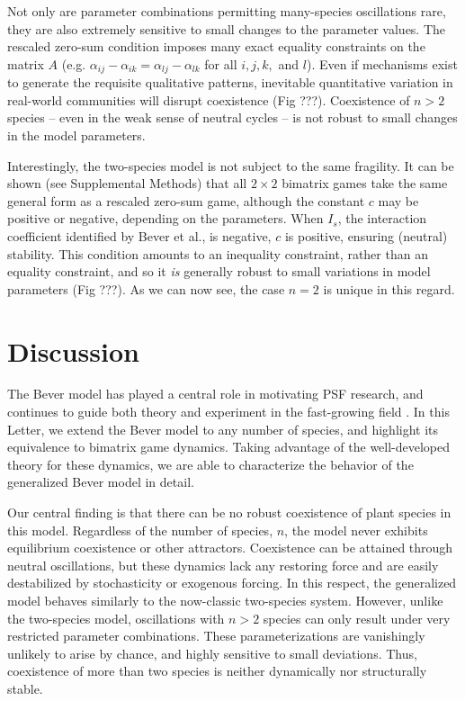 \documentclass[11pt]{article}
\begin{document}
Not only are parameter combinations permitting many-species oscillations rare, they are also extremely sensitive to small changes to the parameter values. The rescaled zero-sum condition imposes many exact equality constraints on the matrix $A$ (e.g. $\alpha_{ij} - \alpha_{ik} = \alpha_{lj} - \alpha_{lk}$ for all $i, j, k,$ and $l$). Even if mechanisms exist to generate the requisite qualitative patterns, inevitable quantitative variation in real-world communities will disrupt coexistence (Fig ???). Coexistence of $n > 2$ species -- even in the weak sense of neutral cycles -- is not robust to small changes in the model parameters.

Interestingly, the two-species model is not subject to the same fragility. It can be shown (see Supplemental Methods) that all $2 \times 2$ bimatrix games take the same general form as a rescaled zero-sum game, although the constant $c$ may be positive or negative, depending on the parameters. When $I_s$, the interaction coefficient identified by Bever et al., is negative, $c$ is positive, ensuring (neutral) stability. This condition amounts to an inequality constraint, rather than an equality constraint, and so it \emph{is} generally robust to small variations in model parameters (Fig ???). As we can now see, the case $n = 2$ is unique in this regard. 

\section{Discussion}

The Bever model has played a central role in motivating PSF research, and continues to guide both theory and experiment in the fast-growing field \cite{bever2015maintenance,kandlikar2019winning,ke2020effects}. In this Letter, we extend the Bever model to any number of species, and highlight its equivalence to bimatrix game dynamics. Taking advantage of the well-developed theory for these dynamics, we are able to characterize the behavior of the generalized Bever model in detail.

Our central finding is that there can be no robust coexistence of plant species in this model. Regardless of the number of species, $n$, the model never exhibits equilibrium coexistence or other attractors. Coexistence can be attained through neutral oscillations, but these dynamics lack any restoring force and are easily destabilized by stochasticity or exogenous forcing. In this respect, the generalized model behaves similarly to the now-classic two-species system. However, unlike the two-species model, oscillations with $n > 2$ species can only result under very restricted parameter combinations. These parameterizations are vanishingly unlikely to arise by chance, and highly sensitive to small deviations. Thus, coexistence of more than two species is neither dynamically nor structurally stable.
\end{document}
